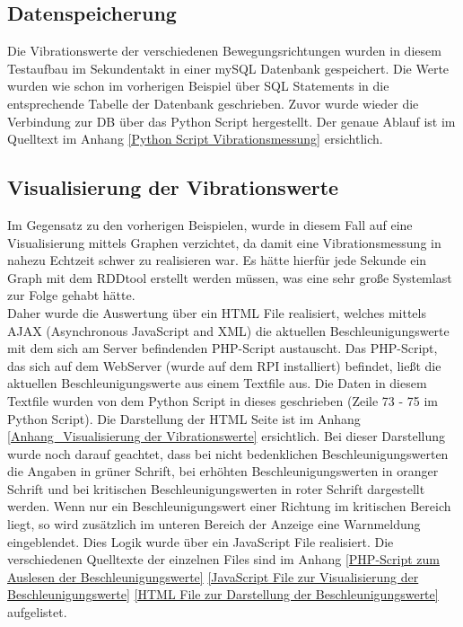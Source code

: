 

\subsection{Datenspeicherung}
\label{subsection_Speicherung_der_Vibrationsdaten}
Die Vibrationswerte der verschiedenen Bewegungsrichtungen wurden in diesem Testaufbau im Sekundentakt in einer mySQL Datenbank gespeichert. Die Werte wurden wie schon im vorherigen Beispiel über SQL Statements in die entsprechende Tabelle der Datenbank geschrieben. Zuvor wurde wieder die Verbindung zur DB über das Python Script hergestellt. Der genaue Ablauf ist im Quelltext im Anhang \ref{Python Script Vibrationsmessung} ersichtlich.

\subsection{Visualisierung der Vibrationswerte}
\label{subsection_Visualisierung der Vibrationswerte}
Im Gegensatz zu den vorherigen Beispielen, wurde in diesem Fall auf eine Visualisierung mittels Graphen verzichtet, da damit eine Vibrationsmessung in nahezu Echtzeit schwer zu realisieren war. Es hätte hierfür jede Sekunde ein Graph mit dem RDDtool erstellt werden müssen, was eine sehr große Systemlast zur Folge gehabt hätte.\\
Daher wurde die Auswertung über ein HTML File realisiert, welches mittels AJAX (Asynchronous JavaScript and XML) die aktuellen Beschleunigungswerte mit dem sich am Server befindenden PHP-Script austauscht. Das PHP-Script, das sich auf dem WebServer (wurde auf dem \ac{RPI} installiert) befindet, ließt die aktuellen Beschleunigungswerte aus einem Textfile aus. Die Daten in diesem Textfile wurden von dem Python Script in dieses geschrieben (Zeile 73 - 75 im Python Script). Die Darstellung der HTML Seite ist im Anhang \ref{Anhang_Visualisierung der Vibrationswerte} ersichtlich. Bei dieser Darstellung wurde noch darauf geachtet, dass bei nicht bedenklichen Beschleunigungswerten die Angaben in grüner Schrift, bei erhöhten Beschleunigungswerten in oranger Schrift und bei kritischen Beschleunigungswerten in roter Schrift dargestellt werden. Wenn nur ein Beschleunigungswert einer Richtung im kritischen Bereich liegt, so wird zusätzlich im unteren Bereich der Anzeige eine Warnmeldung eingeblendet. Dies Logik wurde über ein JavaScript File realisiert. Die verschiedenen Quelltexte der einzelnen Files sind im Anhang   \ref{PHP-Script zum Auslesen der Beschleunigungswerte} \ref{JavaScript File zur Visualisierung der Beschleunigungswerte} \ref{HTML File zur Darstellung der Beschleunigungswerte} aufgelistet. 